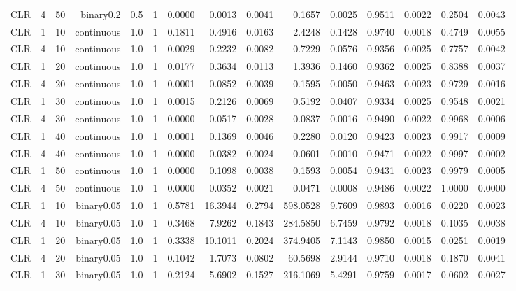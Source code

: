 \begin{longtable}{rrrrrrrrrrrrrrr}
  CLR & 4 & 50 & binary0.2 & 0.5 & 1 & 0.0000 & 0.0013 & 0.0041 & 0.1657 & 0.0025 & 0.9511 & 0.0022 & 0.2504 & 0.0043 \\ 
  CLR & 1 & 10 & continuous & 1.0 & 1 & 0.1811 & 0.4916 & 0.0163 & 2.4248 & 0.1428 & 0.9740 & 0.0018 & 0.4749 & 0.0055 \\ 
  CLR & 4 & 10 & continuous & 1.0 & 1 & 0.0029 & 0.2232 & 0.0082 & 0.7229 & 0.0576 & 0.9356 & 0.0025 & 0.7757 & 0.0042 \\ 
  CLR & 1 & 20 & continuous & 1.0 & 1 & 0.0177 & 0.3634 & 0.0113 & 1.3936 & 0.1460 & 0.9362 & 0.0025 & 0.8388 & 0.0037 \\ 
  CLR & 4 & 20 & continuous & 1.0 & 1 & 0.0001 & 0.0852 & 0.0039 & 0.1595 & 0.0050 & 0.9463 & 0.0023 & 0.9729 & 0.0016 \\ 
  CLR & 1 & 30 & continuous & 1.0 & 1 & 0.0015 & 0.2126 & 0.0069 & 0.5192 & 0.0407 & 0.9334 & 0.0025 & 0.9548 & 0.0021 \\ 
  CLR & 4 & 30 & continuous & 1.0 & 1 & 0.0000 & 0.0517 & 0.0028 & 0.0837 & 0.0016 & 0.9490 & 0.0022 & 0.9968 & 0.0006 \\ 
  CLR & 1 & 40 & continuous & 1.0 & 1 & 0.0001 & 0.1369 & 0.0046 & 0.2280 & 0.0120 & 0.9423 & 0.0023 & 0.9917 & 0.0009 \\ 
  CLR & 4 & 40 & continuous & 1.0 & 1 & 0.0000 & 0.0382 & 0.0024 & 0.0601 & 0.0010 & 0.9471 & 0.0022 & 0.9997 & 0.0002 \\ 
  CLR & 1 & 50 & continuous & 1.0 & 1 & 0.0000 & 0.1098 & 0.0038 & 0.1593 & 0.0054 & 0.9431 & 0.0023 & 0.9979 & 0.0005 \\ 
  CLR & 4 & 50 & continuous & 1.0 & 1 & 0.0000 & 0.0352 & 0.0021 & 0.0471 & 0.0008 & 0.9486 & 0.0022 & 1.0000 & 0.0000 \\ 
  CLR & 1 & 10 & binary0.05 & 1.0 & 1 & 0.5781 & 16.3944 & 0.2794 & 598.0528 & 9.7609 & 0.9893 & 0.0016 & 0.0220 & 0.0023 \\ 
  CLR & 4 & 10 & binary0.05 & 1.0 & 1 & 0.3468 & 7.9262 & 0.1843 & 284.5850 & 6.7459 & 0.9792 & 0.0018 & 0.1035 & 0.0038 \\ 
  CLR & 1 & 20 & binary0.05 & 1.0 & 1 & 0.3338 & 10.1011 & 0.2024 & 374.9405 & 7.1143 & 0.9850 & 0.0015 & 0.0251 & 0.0019 \\ 
  CLR & 4 & 20 & binary0.05 & 1.0 & 1 & 0.1042 & 1.7073 & 0.0802 & 60.5698 & 2.9144 & 0.9710 & 0.0018 & 0.1870 & 0.0041 \\ 
  CLR & 1 & 30 & binary0.05 & 1.0 & 1 & 0.2124 & 5.6902 & 0.1527 & 216.1069 & 5.4291 & 0.9759 & 0.0017 & 0.0602 & 0.0027 \\ 

\end{longtable}
